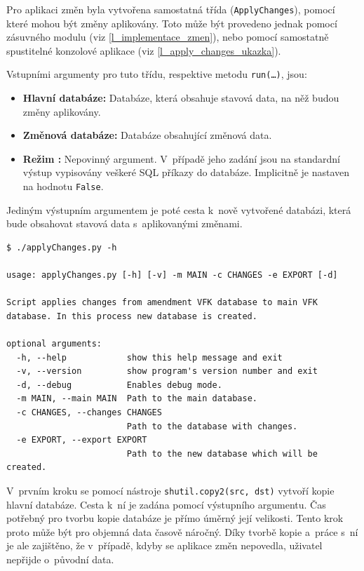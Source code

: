 \documentclass[a4paper,12pt,oneside]{book}
\begin{document}
Pro aplikaci změn byla vytvořena samostatná třída
(\texttt{ApplyChanges}), pomocí které mohou být změny aplikovány. Toto
může být provedeno jednak pomocí zásuvného modulu (viz
\ref{l_implementace_zmen}), nebo pomocí samostatně spustitelné
konzolové aplikace (viz \ref{l_apply_changes_ukazka}).

Vstupními argumenty pro tuto třídu, respektive metodu
\texttt{run(\dots)}, jsou:

\begin{itemize}
 \item \textbf{Hlavní databáze:} Databáze, která obsahuje stavová data, na něž budou změny aplikovány.
 \item \textbf{Změnová databáze:} Databáze obsahující změnová data.
 \item \textbf{Režim :} Nepovinný argument. V~případě jeho
   zadání jsou na standardní výstup vypisovány veškeré SQL příkazy do
   databáze. Implicitně je nastaven na hodnotu \texttt{False}.
\end{itemize}

Jediným výstupním argumentem je poté cesta k~nově vytvořené databázi, která bude obsahovat stavová data s~aplikovanými změnami.

\begin{lstlisting}[caption={Nápověda ke konzolové aplikaci pro implementaci změn}, 
		    label=l_apply_changes_ukazka]
$ ./applyChanges.py -h

usage: applyChanges.py [-h] [-v] -m MAIN -c CHANGES -e EXPORT [-d]

Script applies changes from amendment VFK database to main VFK database. In this process new database is created.

optional arguments:
  -h, --help            show this help message and exit
  -v, --version         show program's version number and exit
  -d, --debug           Enables debug mode.
  -m MAIN, --main MAIN  Path to the main database.
  -c CHANGES, --changes CHANGES
                        Path to the database with changes.
  -e EXPORT, --export EXPORT
                        Path to the new database which will be created.
\end{lstlisting}

V~prvním kroku se pomocí nástroje \texttt{shutil.copy2(src, dst)}
vytvoří kopie hlavní databáze. Cesta k~ní je zadána pomocí výstupního
argumentu. Čas potřebný pro tvorbu kopie databáze je přímo úměrný její
velikosti. Tento krok proto může být pro objemná data časově
náročný. Díky tvorbě kopie a~práce s~ní je ale zajištěno, že
v~případě, kdyby se aplikace změn nepovedla, uživatel nepřijde
o~původní data.
\end{document}
